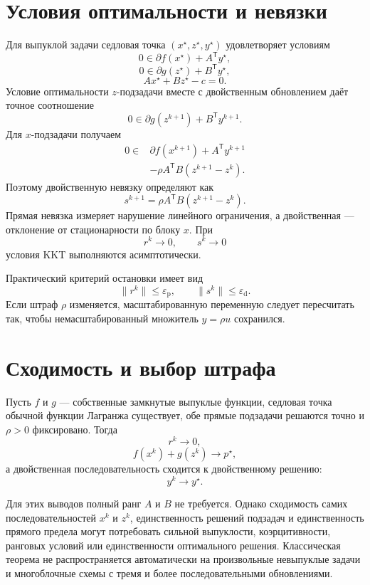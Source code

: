 \section{Условия оптимальности и невязки}

Для выпуклой задачи седловая точка
\((x^\star,z^\star,y^\star)\) удовлетворяет условиям
\[
    0\in\partial f(x^\star)+A^{\mathsf T}y^\star,
\]
\[
    0\in\partial g(z^\star)+B^{\mathsf T}y^\star,
\]
\[
    Ax^\star+Bz^\star-c=0.
\]
Условие оптимальности \(z\)-подзадачи вместе с двойственным
обновлением даёт точное соотношение
\[
    0
    \in
    \partial g(z^{k+1})+B^{\mathsf T}y^{k+1}.
\]
Для \(x\)-подзадачи получаем
\[
\begin{aligned}
    0
    \in{}&
    \partial f(x^{k+1})+A^{\mathsf T}y^{k+1}
    \\
    &-
    \rho A^{\mathsf T}B(z^{k+1}-z^k).
\end{aligned}
\]
Поэтому двойственную невязку определяют как
\[
    s^{k+1}
    =
    \rho A^{\mathsf T}B(z^{k+1}-z^k).
\]
Прямая невязка измеряет нарушение линейного ограничения, а
двойственная --- отклонение от стационарности по блоку \(x\). При
\[
    r^k\to0,
    \qquad
    s^k\to0
\]
условия KKT выполняются асимптотически.

Практический критерий остановки имеет вид
\[
    \lVert r^k\rVert\le\varepsilon_{\mathrm p},
    \qquad
    \lVert s^k\rVert\le\varepsilon_{\mathrm d}.
\]
Если штраф \(\rho\) изменяется, масштабированную переменную следует
пересчитать так, чтобы немасштабированный множитель
\(y=\rho u\) сохранился.

\section{Сходимость и выбор штрафа}

\begin{theorem}
Пусть \(f\) и \(g\) --- собственные замкнутые выпуклые функции,
седловая точка обычной функции Лагранжа существует, обе прямые
подзадачи решаются точно и \(\rho>0\) фиксировано. Тогда
\[
    r^k\to0,
\]
\[
    f(x^k)+g(z^k)\to p^\star,
\]
а двойственная последовательность сходится к двойственному решению:
\[
    y^k\to y^\star.
\]
\end{theorem}

Для этих выводов полный ранг \(A\) и \(B\) не требуется. Однако
сходимость самих последовательностей \(x^k\) и \(z^k\),
единственность решений подзадач и единственность прямого предела могут
потребовать сильной выпуклости, коэрцитивности, ранговых условий или
единственности оптимального решения. Классическая теорема не
распространяется автоматически на произвольные невыпуклые задачи и
многоблочные схемы с тремя и более последовательными обновлениями.

